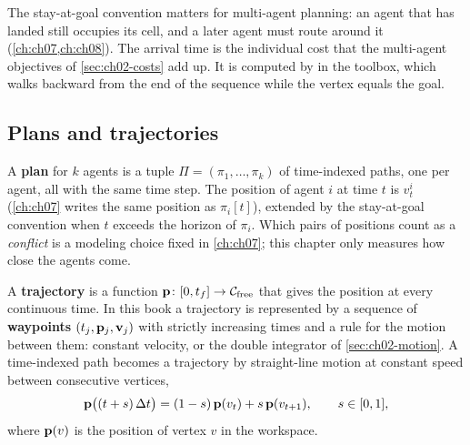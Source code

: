 The stay-at-goal convention matters for multi-agent planning: an agent that has landed still occupies its cell, and a later agent must route around it (\cref{ch:ch07,ch:ch08}). The arrival time is the individual cost that the multi-agent objectives of \cref{sec:ch02-costs} add up. It is computed by  in the toolbox, which walks backward from the end of the sequence while the vertex equals the goal.

\subsection{Plans and trajectories}
\label{sec:ch02-plans}

\begin{definition}[Plan]
\label{def:ch02-plan}
A \textbf{plan} for $k$ agents is a tuple $\Pi=(\pi_1,\dots,\pi_k)$ of time-indexed paths, one per agent, all with the same time step. The position of agent $i$ at time $t$ is $v^i_t$ (\cref{ch:ch07} writes the same position as $\pi_i[t]$), extended by the stay-at-goal convention when $t$ exceeds the horizon of $\pi_i$. Which pairs of positions count as a \emph{conflict} is a modeling choice fixed in \cref{ch:ch07}; this chapter only measures how close the agents come.
\end{definition}

\begin{definition}[Trajectory]
\label{def:ch02-trajectory}
A \textbf{trajectory} is a function $\mathbf{p}\colon[0,t_f]\to\mathcal{C}_{\mathrm{free}}$ that gives the position at every continuous time. In this book a trajectory is represented by a sequence of \textbf{waypoints} $(t_j,\mathbf{p}_j,\mathbf{v}_j)$ with strictly increasing times and a rule for the motion between them: constant velocity, or the double integrator of \cref{sec:ch02-motion}. A time-indexed path becomes a trajectory by straight-line motion at constant speed between consecutive vertices,
\begin{equation}
\mathbf{p}\bigl((t+s)\,\Delta t\bigr)=(1-s)\,\mathbf{p}(v_t)+s\,\mathbf{p}(v_{t+1}),\qquad s\in[0,1],
\label{eq:ch02-path-to-trajectory}
\end{equation}
where $\mathbf{p}(v)$ is the position of vertex $v$ in the workspace.
\end{definition}


